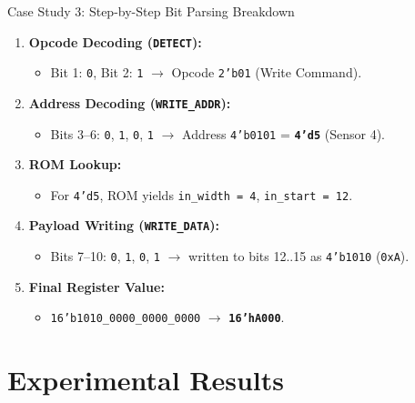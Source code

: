 \documentclass{beamer}
\begin{document}
\begin{frame}{Case Study 3: Step-by-Step Bit Parsing Breakdown}
  \begin{enumerate}
    \scriptsize
    \item \textbf{Opcode Decoding (\texttt{DETECT}):}
    \begin{itemize}
      \item Bit 1: \texttt{0}, Bit 2: \texttt{1} $\rightarrow$ Opcode \texttt{2'b01} (Write Command).
    \end{itemize}
    \item \textbf{Address Decoding (\texttt{WRITE\_ADDR}):}
    \begin{itemize}
      \item Bits 3--6: \texttt{0}, \texttt{1}, \texttt{0}, \texttt{1} $\rightarrow$ Address \texttt{4'b0101} = \textbf{\texttt{4'd5}} (Sensor 4).
    \end{itemize}
    \item \textbf{ROM Lookup:}
    \begin{itemize}
      \item For \texttt{4'd5}, ROM yields \texttt{in\_width = 4}, \texttt{in\_start = 12}.
    \end{itemize}
    \item \textbf{Payload Writing (\texttt{WRITE\_DATA}):}
    \begin{itemize}
      \item Bits 7--10: \texttt{0}, \texttt{1}, \texttt{0}, \texttt{1} $\rightarrow$ written to bits 12..15 as \texttt{4'b1010} (\texttt{0xA}).
    \end{itemize}
    \item \textbf{Final Register Value:}
    \begin{itemize}
      \item \texttt{16'b1010\_0000\_0000\_0000} $\rightarrow$ \textbf{\texttt{16'hA000}}.
    \end{itemize}
  \end{enumerate}
\end{frame}

\section{Experimental Results}
\end{document}
